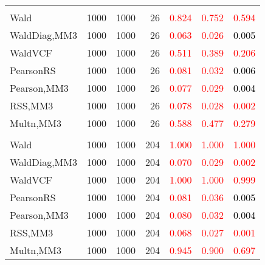 \documentclass[
]{article}
\begin{document}
\begin{table}[H]
{\begin{tabular}[t]{lrrrrrr}
\addlinespace[0.3em]
\multicolumn{7}{l}{\textbf{2F 10V}}\\
\hspace{1em}Wald & 1000 & 1000 & 26 & \textcolor{red}{0.824} & \textcolor{red}{0.752} & \textcolor{red}{0.594}\\
\hspace{1em}WaldDiag,MM3 & 1000 & 1000 & 26 & \textcolor{red}{0.063} & \textcolor{red}{0.026} & \textcolor{black}{0.005}\\
\hspace{1em}WaldVCF & 1000 & 1000 & 26 & \textcolor{red}{0.511} & \textcolor{red}{0.389} & \textcolor{red}{0.206}\\
\hspace{1em}PearsonRS & 1000 & 1000 & 26 & \textcolor{red}{0.081} & \textcolor{red}{0.032} & \textcolor{black}{0.006}\\
\hspace{1em}Pearson,MM3 & 1000 & 1000 & 26 & \textcolor{red}{0.077} & \textcolor{red}{0.029} & \textcolor{black}{0.004}\\
\hspace{1em}RSS,MM3 & 1000 & 1000 & 26 & \textcolor{red}{0.078} & \textcolor{red}{0.028} & \textcolor{red}{0.002}\\
\hspace{1em}Multn,MM3 & 1000 & 1000 & 26 & \textcolor{red}{0.588} & \textcolor{red}{0.477} & \textcolor{red}{0.279}\\
\addlinespace[0.3em]
\multicolumn{7}{l}{\textbf{3F 15V}}\\
\hspace{1em}Wald & 1000 & 1000 & 204 & \textcolor{red}{1.000} & \textcolor{red}{1.000} & \textcolor{red}{1.000}\\
\hspace{1em}WaldDiag,MM3 & 1000 & 1000 & 204 & \textcolor{red}{0.070} & \textcolor{red}{0.029} & \textcolor{red}{0.002}\\
\hspace{1em}WaldVCF & 1000 & 1000 & 204 & \textcolor{red}{1.000} & \textcolor{red}{1.000} & \textcolor{red}{0.999}\\
\hspace{1em}PearsonRS & 1000 & 1000 & 204 & \textcolor{red}{0.081} & \textcolor{red}{0.036} & \textcolor{black}{0.005}\\
\hspace{1em}Pearson,MM3 & 1000 & 1000 & 204 & \textcolor{red}{0.080} & \textcolor{red}{0.032} & \textcolor{black}{0.004}\\
\hspace{1em}RSS,MM3 & 1000 & 1000 & 204 & \textcolor{red}{0.068} & \textcolor{red}{0.027} & \textcolor{red}{0.001}\\
\hspace{1em}Multn,MM3 & 1000 & 1000 & 204 & \textcolor{red}{0.945} & \textcolor{red}{0.900} & \textcolor{red}{0.697}\\
\bottomrule
\end{tabular}}
\endgroup{}
\end{table}
\end{document}
